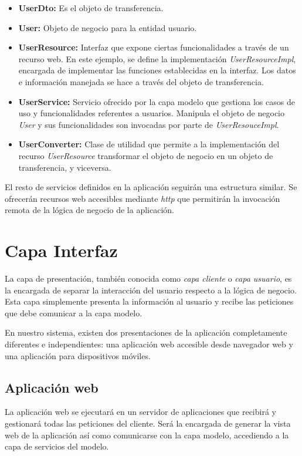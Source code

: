 \begin{itemize}
	\item \textbf{UserDto: } Es el objeto de transferencia.
	\item \textbf{User: } Objeto de negocio para la entidad usuario.
	\item \textbf{UserResource: } Interfaz que expone ciertas funcionalidades a través de un recurso web. En este ejemplo, se define la implementación \textit{UserResourceImpl}, encargada de implementar las funciones establecidas en la interfaz. Los datos e información manejada se hace a través del objeto de transferencia.
	\item \textbf{UserService: } Servicio ofrecido por la capa modelo que gestiona los casos de uso y funcionalidades referentes a usuarios. Manipula el objeto de negocio \textit{User} y sus funcionalidades son invocadas por parte de \textit{UserResouceImpl}.
	\item \textbf{UserConverter: } Clase de utilidad que permite a la implementación del recurso \textit{UserResource} transformar el objeto de negocio en un objeto de transferencia, y viceversa.

\end{itemize}

El resto de servicios definidos en la aplicación seguirán una estructura similar. Se ofrecerán recursos web accesibles mediante \textit{http} que permitirán la invocación remota de la lógica de negocio de la aplicación.


\newpage
\section{Capa Interfaz}
La capa de presentación, también conocida como \textit{capa cliente} o \textit{capa usuario}, es la encargada de separar la interacción del usuario respecto a la lógica de negocio. Esta capa simplemente presenta la información al usuario y recibe las peticiones que debe comunicar a la capa modelo.

En nuestro sistema, existen dos presentaciones de la aplicación completamente diferentes e independientes: una aplicación web accesible desde navegador web y una aplicación para dispositivos móviles.

\subsection{Aplicación web}
La aplicación web se ejecutará en un servidor de aplicaciones que recibirá y gestionará todas las peticiones del cliente. Será la encargada de generar la vista web de la aplicación así como comunicarse con la capa modelo, accediendo a la capa de servicios del modelo.

